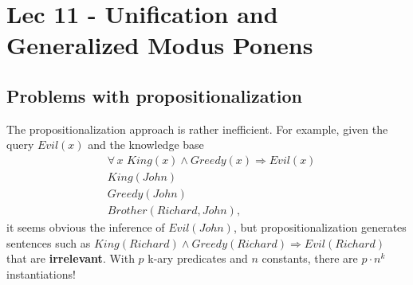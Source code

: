 \chapter{Lec 11 - Unification and Generalized Modus Ponens}

\section{Problems with propositionalization}
The propositionalization approach is rather inefficient. For
example, given the query $Evil(x)$ and the knowledge base
\[
\begin{split}
    & \forall \, x \,\, King(x) \land Greedy(x) \Rightarrow Evil(x)\\
    & King(John)\\
    & Greedy(John)\\
    & Brother (Richard, John),
\end{split}
\]
it seems obvious the inference of $Evil(John)$, but propositionalization generates sentences such as $King(Richard) \land Greedy(Richard) \Rightarrow Evil(Richard)$ that are \textbf{irrelevant}. With $p$ k-ary predicates and $n$ constants, there are $p \cdot n^k$ instantiations!

